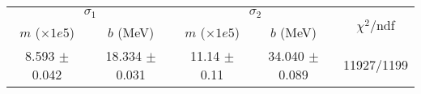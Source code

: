 \begin{tabular}{cc|cc||c}
\multicolumn{2}{c|}{$\sigma_1$} & \multicolumn{2}{|c}{$\sigma_2$} & \multirow{2}{*}{$\chi^2/$ndf} \\
$m$ ($\times1e5$) & $b$ (MeV) & $m$ ($\times1e5$) & $b$ (MeV) & \\
\hline
8.593 $\pm$ 0.042 & 18.334 $\pm$ 0.031 & 11.14 $\pm$ 0.11 & 34.040 $\pm$ 0.089 & 11927/1199\\
\end{tabular}
